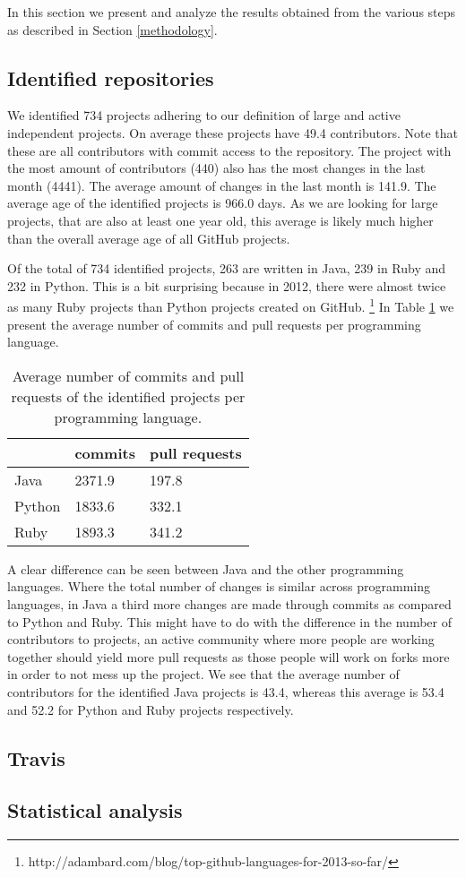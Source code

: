 In this section we present and analyze the results obtained from the various steps as described in Section \ref{methodology}.

\subsection{Identified repositories}
We identified 734 projects adhering to our definition of large and active independent projects.
On average these projects have 49.4 contributors. 
Note that these are all contributors with commit access to the repository.
The project with the most amount of contributors (440) also has the most changes in the last month (4441).
The average amount of changes in the last month is 141.9.
The average age of the identified projects is 966.0 days. 
As we are looking for large projects, that are also at least one year old, this average is likely much higher than the overall average age of all GitHub projects.

Of the total of 734 identified projects, 263 are written in Java, 239 in Ruby and 232 in Python. 
This is a bit surprising because in 2012, there were almost twice as many Ruby projects than Python projects created on GitHub. \footnote{http://adambard.com/blog/top-github-languages-for-2013-so-far/}
In Table \ref{tab:allChanges} we present the average number of commits and pull requests per programming language.
\begin{table}[h]
\begin{tabular}{ l | l l }
 & commits & pull requests\\
\hline
Java & 2371.9 & 197.8 \\
Python & 1833.6 & 332.1 \\
Ruby & 1893.3 & 341.2
\end{tabular}
\caption{Average number of commits and pull requests of the identified projects per programming language.}
\label{tab:allChanges}
\end{table}
A clear difference can be seen between Java and the other programming languages. 
Where the total number of changes is similar across programming languages, in Java a third more changes are made through commits as compared to Python and Ruby.
This might have to do with the difference in the number of contributors to projects, an active community where more people are working together should yield more pull requests as those people will work on forks more in order to not mess up the project. 
We see that the average number of contributors for the identified Java projects is 43.4, whereas this average is 53.4 and 52.2 for Python and Ruby projects respectively.

\subsection{Travis}

\subsection{Statistical analysis}
